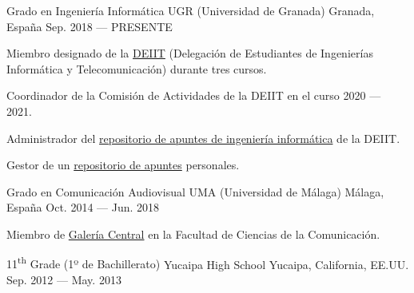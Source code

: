 
\begin{cventries}

\cventry%
	{Grado en Ingeniería Informática} %
	{UGR (Universidad de Granada)} %
	{Granada, España} %
	{Sep. 2018 --- PRESENTE} %
	{%
		\begin{cvitems} %
			\item
				Miembro designado de la \href{https://deiit.ugr.es/}{DEIIT} (Delegación de Estudiantes de Ingenierías Informática y Telecomunicación) durante tres cursos.
			\item
				Coordinador de la Comisión de Actividades de la DEIIT en el curso 2020 --- 2021.
			\item
				Administrador del \href{https://github.com/DEIIT/Ingenieria-Informatica}{repositorio de apuntes de ingeniería informática} de la DEIIT\@.
			\item
				Gestor de un \href{https://github.com/Groctel/ugr-informatica}{repositorio de apuntes} personales.
		\end{cvitems}
	}

\cventry%
	{Grado en Comunicación Audiovisual}
	{UMA (Universidad de Málaga)}
	{Málaga, España}
	{Oct. 2014 --- Jun. 2018}
	{%
		\begin{cvitems}
			\item
				Miembro de \href{https://twitter.com/galeriacentral}{Galería Central} en la Facultad de Ciencias de la Comunicación.
		\end{cvitems}
	}

\cventry%
	{11\textsuperscript{th} Grade (1º de Bachillerato)}
	{Yucaipa High School}
	{Yucaipa, California, EE.UU.}
	{Sep. 2012 --- May. 2013}
	{}

\end{cventries}
